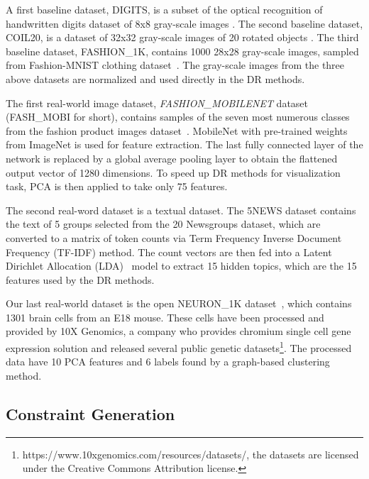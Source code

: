 A first baseline dataset, DIGITS, is a subset of the optical recognition of handwritten digits dataset of 8x8 gray-scale images \cite{kaynak1995methods}.
The second baseline dataset, COIL20, is a dataset of 32x32 gray-scale images of 20 rotated objects  \cite{nene1996}.
The third baseline dataset, {FASHION\_1K}, contains 1000 28x28 gray-scale images, sampled from Fashion-MNIST clothing dataset~\cite{xiao2017/online}.
The gray-scale images from the three above datasets are normalized and used directly in the DR methods.

The first real-world image dataset, \emph{FASHION\_MOBILENET} dataset ({FASH\_MOBI} for short), contains samples of the seven most numerous classes from the fashion product images dataset~\cite{fashionproduct}.
MobileNet\cite{howard2017mobilenets} with pre-trained weights from ImageNet is used for feature extraction.
The last fully connected layer of the network is replaced by a global average pooling layer \cite{lin2013network} to obtain the flattened output vector of 1280 dimensions.
To speed up DR methods for visualization task, PCA is then applied to take only 75 features.

The second real-word dataset is a textual dataset. The 5NEWS dataset contains the text of 5 groups selected from the 20 Newsgroups dataset, which are converted to a matrix of token counts via Term Frequency Inverse Document Frequency (TF-IDF) method.
The count vectors are then fed into a Latent Dirichlet Allocation (LDA)~\cite{blei2003latent} model to extract 15 hidden topics, which are the 15 features used by the DR methods.

Our last real-world dataset is the open {NEURON\_1K} dataset~\cite{neuron1k}, which contains 1301 brain cells from an E18 mouse. These cells have been processed and provided by 10X Genomics, a company who provides chromium single cell gene expression solution and released several public genetic datasets\footnote{https://www.10xgenomics.com/resources/datasets/, the datasets are licensed under the Creative Commons Attribution license.}.
The processed data have 10 PCA features and 6 labels found by a graph-based clustering method.


\subsection{Constraint Generation}\label{sec:xp:constraint}

